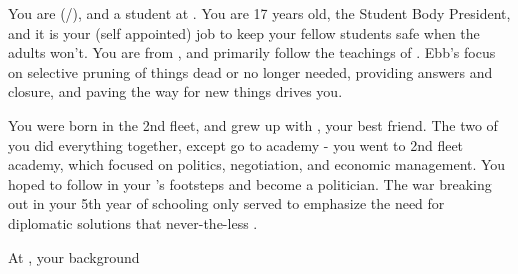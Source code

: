 \documentclass[char]{GL2020}
\begin{document}
\name{\cPresident{}}



You are \cPresident{} (\cPresident{\they}/\cPresident{\them}), and a student at \pSchool{}. You are 17 years old, the Student Body President, and it is your (self appointed) job to keep your fellow students safe when the adults won't. You are from \pShip{}, and primarily follow the teachings of \cEbb{\full}. Ebb's focus on selective pruning of things dead or no longer needed, providing answers and closure, and paving the way for new things drives you.


You were born in the 2nd fleet, and grew up with \cInitiate{}, your best friend. The two of you did everything together, except go to academy - you went to 2nd fleet academy, which focused on politics, negotiation, and economic management. You hoped to follow in your \cHeadDiplomat{\auncle}'s footsteps and become a politician. The war breaking out in your 5th year of schooling only served to emphasize the need for diplomatic solutions that never-the-less .

At \pCollege{}, your background



\end{document}
